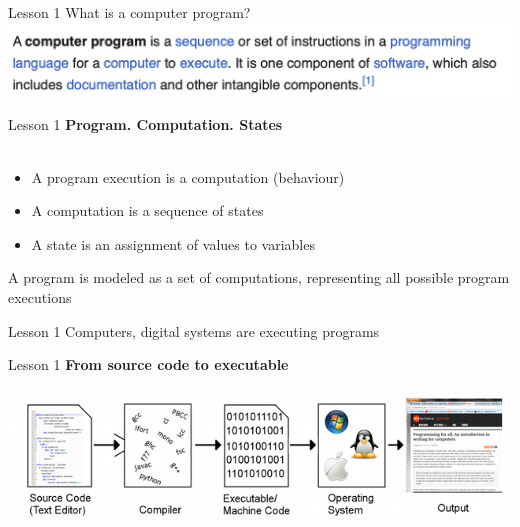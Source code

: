 \documentclass[aspectratio=1610]{beamer}
\begin{document}
\begin{frame}{Lesson 1}{}
{\Huge{What is a computer program?}}
\includegraphics[scale=0.67]{Images/program}
\end{frame}

\begin{frame}{Lesson 1}{}
\Large
\textbf{Program. Computation. States}\\~\\

\Large{
\begin{itemize}
    \item A program execution is a computation (behaviour)
    \item A computation is a sequence of states    
    \item A state is an assignment of values to variables
\end{itemize}}

\Large {A program is modeled as a set of computations, representing all possible program executions}
\end{frame}








\begin{frame}{Lesson 1}{}
\Huge Computers, digital systems are executing programs
\end{frame}


\begin{frame}{Lesson 1}{}
\Large
\textbf{From source code to executable}\\~\\ 
\includegraphics[scale=0.65]{Images/CompilationChain}
\end{frame}
\end{document}
